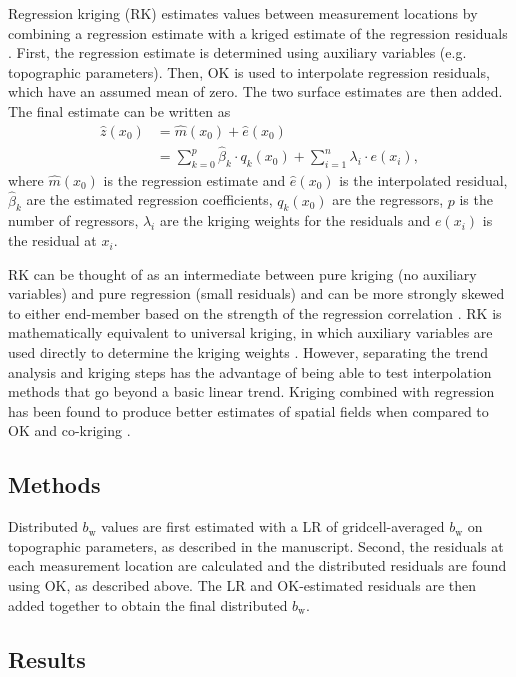 \documentclass[onecolumn, letterpaper]{igs}
\begin{document}
Regression kriging (RK) estimates values between measurement locations by combining a regression estimate with a kriged estimate of the regression residuals \citep{Hengl2007}. First, the regression estimate is determined using auxiliary variables (e.g. topographic parameters). Then, OK is used to interpolate regression residuals, which have an assumed mean of zero. The two surface estimates are then added. The final estimate can be written as 
\begin{align}
\hat{z}(x_0) &= \hat{m}(x_0) + \hat{e}(x_0)\\
& = \sum^p_{k=0}\hat{\beta}_k \cdot	q_k(x_0)+ \sum_{i=1}^{n} \lambda_i \cdot e(x_i),
\end{align}
where $\hat{m}(x_0)$ is the regression estimate and $\hat{e}(x_0)$ is the interpolated residual, $\hat{\beta}_k$ are the estimated regression coefficients, $q_k(x_0)$ are the regressors, $p$ is the number of regressors, $\lambda_i$ are the kriging weights for the residuals and $e(x_i)$ is the residual at $x_i$. 

RK can be thought of as an intermediate between pure kriging (no auxiliary variables) and pure regression (small residuals) and can be more strongly skewed to either end-member based on the strength of the regression correlation \citep{Hengl2007}. RK is mathematically equivalent to universal kriging, in which auxiliary variables are used directly to determine the kriging weights \citep{Hengl2007}. However, separating the trend analysis and kriging steps has the advantage of being able to test interpolation methods that go beyond a basic linear trend. Kriging combined with regression has been found to produce better estimates of spatial fields when compared to OK and co-kriging \citep[e.g.][]{Knotters1995}.

\subsection{Methods}

Distributed $b_\mathrm{w}$ values are first estimated with a LR of gridcell-averaged $b_\mathrm{w}$ on topographic parameters, as described in the manuscript. Second, the residuals at each measurement location are calculated and the distributed residuals are found using OK, as described above. The LR and OK-estimated residuals are then added together to obtain the final distributed $b_\mathrm{w}$. 

\subsection{Results}
\end{document}
